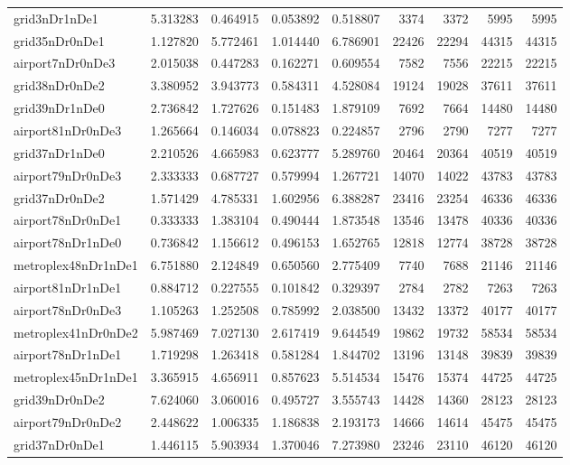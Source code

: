 \begin{longtable}{|l|r|r|r|r|r|r|r|r|}
grid3nDr1nDe1 & 5.313283 & 0.464915 & 0.053892 & 0.518807 & 3374 & 3372 & 5995 & 5995 \\
grid35nDr0nDe1 & 1.127820 & 5.772461 & 1.014440 & 6.786901 & 22426 & 22294 & 44315 & 44315 \\
airport7nDr0nDe3 & 2.015038 & 0.447283 & 0.162271 & 0.609554 & 7582 & 7556 & 22215 & 22215 \\
grid38nDr0nDe2 & 3.380952 & 3.943773 & 0.584311 & 4.528084 & 19124 & 19028 & 37611 & 37611 \\
grid39nDr1nDe0 & 2.736842 & 1.727626 & 0.151483 & 1.879109 & 7692 & 7664 & 14480 & 14480 \\
airport81nDr0nDe3 & 1.265664 & 0.146034 & 0.078823 & 0.224857 & 2796 & 2790 & 7277 & 7277 \\
grid37nDr1nDe0 & 2.210526 & 4.665983 & 0.623777 & 5.289760 & 20464 & 20364 & 40519 & 40519 \\
airport79nDr0nDe3 & 2.333333 & 0.687727 & 0.579994 & 1.267721 & 14070 & 14022 & 43783 & 43783 \\
grid37nDr0nDe2 & 1.571429 & 4.785331 & 1.602956 & 6.388287 & 23416 & 23254 & 46336 & 46336 \\
airport78nDr0nDe1 & 0.333333 & 1.383104 & 0.490444 & 1.873548 & 13546 & 13478 & 40336 & 40336 \\
airport78nDr1nDe0 & 0.736842 & 1.156612 & 0.496153 & 1.652765 & 12818 & 12774 & 38728 & 38728 \\
metroplex48nDr1nDe1 & 6.751880 & 2.124849 & 0.650560 & 2.775409 & 7740 & 7688 & 21146 & 21146 \\
airport81nDr1nDe1 & 0.884712 & 0.227555 & 0.101842 & 0.329397 & 2784 & 2782 & 7263 & 7263 \\
airport78nDr0nDe3 & 1.105263 & 1.252508 & 0.785992 & 2.038500 & 13432 & 13372 & 40177 & 40177 \\
metroplex41nDr0nDe2 & 5.987469 & 7.027130 & 2.617419 & 9.644549 & 19862 & 19732 & 58534 & 58534 \\
airport78nDr1nDe1 & 1.719298 & 1.263418 & 0.581284 & 1.844702 & 13196 & 13148 & 39839 & 39839 \\
metroplex45nDr1nDe1 & 3.365915 & 4.656911 & 0.857623 & 5.514534 & 15476 & 15374 & 44725 & 44725 \\
grid39nDr0nDe2 & 7.624060 & 3.060016 & 0.495727 & 3.555743 & 14428 & 14360 & 28123 & 28123 \\
airport79nDr0nDe2 & 2.448622 & 1.006335 & 1.186838 & 2.193173 & 14666 & 14614 & 45475 & 45475 \\
grid37nDr0nDe1 & 1.446115 & 5.903934 & 1.370046 & 7.273980 & 23246 & 23110 & 46120 & 46120 \\

\end{longtable}
